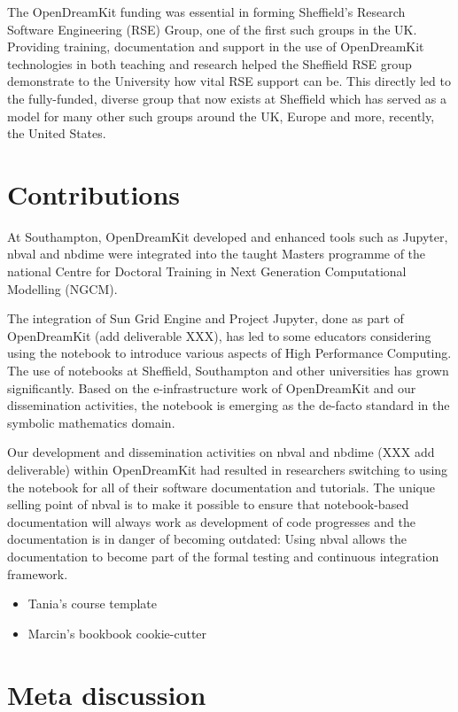 \documentclass{deliverablereport}
\begin{document}
The OpenDreamKit funding was essential in forming Sheffield's Research
Software Engineering (RSE) Group, one of the first such groups in the
UK. Providing training, documentation and support in the use of
OpenDreamKit technologies in both teaching and research helped the
Sheffield RSE group demonstrate to the University how vital RSE support
can be. This directly led to the fully-funded, diverse group that now
exists at Sheffield which has served as a model for many other such
groups around the UK, Europe and more, recently, the United States.

\section{Contributions}

At Southampton, OpenDreamKit developed and enhanced tools such as
Jupyter, nbval and nbdime were integrated into the taught Masters
programme of the national Centre for Doctoral Training in Next
Generation Computational Modelling (NGCM).

The integration of Sun Grid Engine and Project Jupyter, done as part of
OpenDreamKit (add deliverable XXX), has led to some educators
considering using the notebook to introduce various aspects of High
Performance Computing. The use of notebooks at Sheffield, Southampton
and other universities has grown significantly. Based on the
e-infrastructure work of OpenDreamKit and our dissemination activities,
the notebook is emerging as the de-facto standard in the symbolic
mathematics domain.

Our development and dissemination activities on nbval and nbdime (XXX
add deliverable) within OpenDreamKit had resulted in researchers
switching to using the notebook for all of their software documentation
and tutorials. The unique selling point of nbval is to make it possible
to ensure that notebook-based documentation will always work as
development of code progresses and the documentation is in danger of
becoming outdated: Using nbval allows the documentation to become part
of the formal testing and continuous integration framework.

\begin{itemize}
\tightlist
\item
  Tania's course template
\item
  Marcin's bookbook cookie-cutter
\end{itemize}

\section{Meta discussion}
\end{document}
